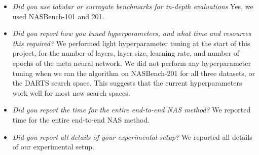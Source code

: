 \documentclass[11pt]{article}
\numberwithin{equation}{section}
\numberwithin{figure}{section}
\theoremstyle{plain}
\theoremstyle{definition}
\begin{document}
\begin{itemize}
    \item \emph{Did you use tabular or surrogate benchmarks for in-depth evaluations} 
    Yes, we used NASBench-101 and 201.
    \item \emph{Did you report how you tuned hyperparameters, and what time and resources this required?}
    We performed light hyperparameter tuning at the start of this project, for
    the number of layers, layer size, learning rate, and number of epochs of the meta neural
    network. 
    We did not perform any hyperparameter tuning when we ran the algorithm on NASBench-201 for
    all three datasets, or the DARTS search space.
    This suggests that the current hyperparameters work well for most
    new search spaces.
    \item \emph{Did you report the time for the entire end-to-end NAS method?}
    We reported time for the entire end-to-end NAS method.
    \item \emph{Did you report all details of your experimental setup?}
    We reported all details of our experimental setup.

\end{itemize} 
\end{document}
